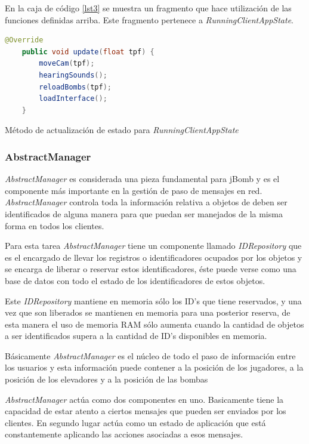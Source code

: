 \documentclass[a4paper,12pt,openany,oneside]{book}
\begin{document}
En la caja de código \ref{lst3} se muestra un fragmento que hace utilización de las funciones definidas arriba. Este fragmento pertenece a \textit{RunningClientAppState}.
\begin{codigo}
\begin{lstlisting}[language=Java,frame=single,basicstyle=\scriptsize]
    @Override
    public void update(float tpf) {
        moveCam(tpf);
        hearingSounds();
        reloadBombs(tpf);
        loadInterface();
    }
\end{lstlisting}
\caption{Método de actualización de estado para \textit{RunningClientAppState}}
\label{lst3}
\end{codigo}
\subsubsection{AbstractManager}
\textit{AbstractManager} es considerada una pieza fundamental para jBomb y es el componente más importante en la gestión de paso de mensajes en red. \textit{AbstractManager} controla toda la información relativa a objetos de deben ser identificados de alguna manera para que puedan ser manejados de la misma forma en todos los clientes. 

Para esta tarea \textit{AbstractManager} tiene un componente llamado \textit{IDRepository} que es el encargado de llevar los registros o identificadores ocupados por los objetos y se encarga de liberar o reservar estos identificadores, éste puede verse como una base de datos con todo el estado de los identificadores de estos objetos. 

Este \textit{IDRepository} mantiene en memoria sólo los ID's que tiene reservados, y una vez que son liberados se mantienen en memoria para una posterior reserva, de esta manera el uso de memoria RAM sólo aumenta cuando la cantidad de objetos a ser identificados supera a la cantidad de ID's disponibles en memoria.

Básicamente \textit{AbstractManager} es el núcleo de todo el paso de información entre los usuarios y esta información puede contener a la posición de los jugadores, a la posición de los elevadores y a la posición de las bombas

\textit{AbstractManager} actúa como dos componentes en uno. Basicamente tiene la capacidad de estar atento a ciertos mensajes que pueden ser enviados por los clientes. En segundo lugar actúa como un estado de aplicación que está constantemente aplicando las acciones asociadas a esos mensajes.
\end{document}
